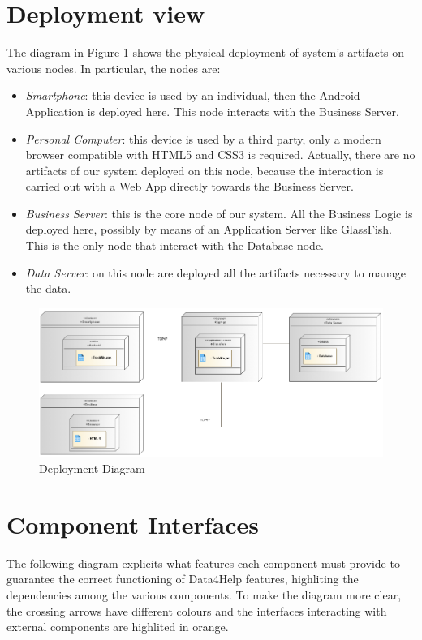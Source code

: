 \section{Deployment view}



The diagram in Figure \ref{f:depl_diag} shows the physical deployment of system's artifacts on various nodes.
In particular, the nodes are:

\begin{itemize}
\item \textit{Smartphone}: this device is used by an individual, then the Android Application is deployed here. This node interacts with the Business Server.
\item \textit{Personal Computer}: this device is used by a third party, only a modern browser compatible with HTML5 and CSS3 is required. Actually, there are no artifacts of our system deployed on this node, because the interaction is carried out with a Web App directly towards the Business Server.
\item \textit{Business Server}: this is the core node of our system.
All the Business Logic is deployed here, possibly by means of an Application Server like GlassFish.
This is the only node that interact with the Database node.
\item \textit{Data Server}: on this node are deployed all the artifacts necessary to manage the data.
\end{itemize}


\begin{figure}[h]
\centering
\includegraphics[width=\linewidth]{resources/uml/depldiag}
\caption{Deployment Diagram}\label{f:depl_diag}
\end{figure}

\section{Component Interfaces}
The following diagram explicits what features each component must provide to guarantee the correct functioning of Data4Help features, highliting the dependencies among the various components.
To make the diagram more clear, the crossing arrows have different colours and the interfaces interacting with external components are highlited in orange.


